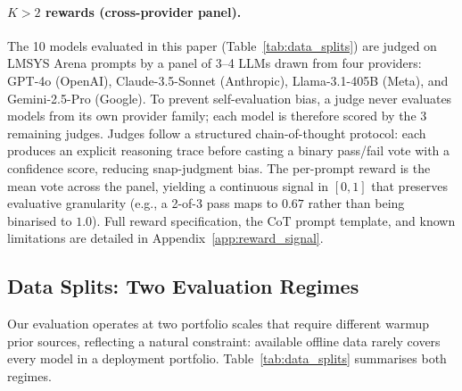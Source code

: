 \paragraph{$K{>}2$ rewards (cross-provider panel).}
The 10 models evaluated in this paper (Table~\ref{tab:data_splits}) are judged on LMSYS Arena prompts by a panel of 3--4 LLMs drawn from four providers: GPT-4o (OpenAI), Claude-3.5-Sonnet (Anthropic), Llama-3.1-405B (Meta), and Gemini-2.5-Pro (Google).
To prevent self-evaluation bias, a judge never evaluates models from its own provider family; each model is therefore scored by the 3 remaining judges.
Judges follow a structured chain-of-thought protocol: each produces an explicit reasoning trace before casting a binary pass/fail vote with a confidence score, reducing snap-judgment bias.
The per-prompt reward is the mean vote across the panel, yielding a continuous signal in $[0,1]$ that preserves evaluative granularity (e.g., a 2-of-3 pass maps to $0.67$ rather than being binarised to $1.0$).
Full reward specification, the CoT prompt template, and known limitations are detailed in Appendix~\ref{app:reward_signal}.

\subsection{Data Splits: Two Evaluation Regimes}
\label{sec:data_splits}

Our evaluation operates at two portfolio scales that require different warmup prior sources, reflecting a natural constraint: available offline data rarely covers every model in a deployment portfolio.
Table~\ref{tab:data_splits} summarises both regimes.

\begin{table}[t]
\centering
\caption{Data splits for two evaluation regimes. The holdout set (750 prompts) is identical across regimes; only the model columns read differ.}
\label{tab:data_splits}
\small
{}
\end{table}

